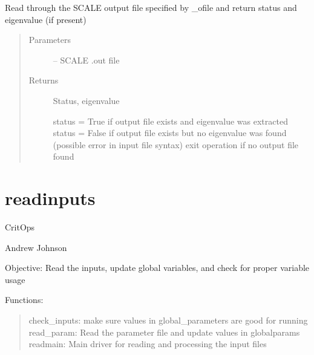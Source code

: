 \documentclass[letterpaper,10pt,english]{sphinxmanual}
\begin{document}
\begin{fulllineitems}
\label{\detokenize{iterator:critops.iterator.parse_scale_out_eig}}
Read through the SCALE output file specified by \_ofile and return status and eigenvalue (if present)
\begin{quote}\begin{description}
\item[{Parameters}] \leavevmode
{} -- SCALE .out file

\item[{Returns}] \leavevmode

Status, eigenvalue

status = True if output file exists and eigenvalue was extracted
status = False if output file exists but no eigenvalue was found (possible error in input file syntax)
exit operation if no output file found


\end{description}\end{quote}

\end{fulllineitems}



\chapter{readinputs}
\label{\detokenize{readinputs::doc}}\label{\detokenize{readinputs:readinputs}}\label{\detokenize{readinputs:module-critops.readinputs}}
CritOps

Andrew Johnson

Objective: Read the inputs, update global variables, and check for proper variable usage

Functions:
\begin{quote}

check\_inputs: make sure values in global\_parameters are good for running
read\_param: Read the parameter file and update values in globalparams
readmain: Main driver for reading and processing the input files
\end{quote}
\end{document}
